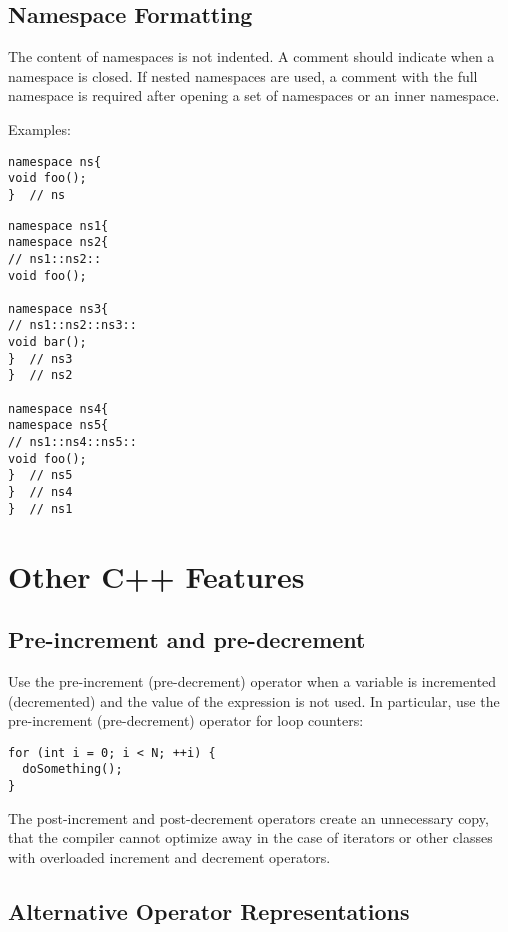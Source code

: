 \subsection{Namespace Formatting}

The content of namespaces is not indented.
A comment should indicate when a namespace is closed.
If nested namespaces are used, a comment with the full namespace is required after opening a set of namespaces or an inner namespace.

Examples:
\begin{lstlisting}
namespace ns{
void foo();
}  // ns
\end{lstlisting}

\begin{lstlisting}
namespace ns1{
namespace ns2{
// ns1::ns2::
void foo();

namespace ns3{
// ns1::ns2::ns3::
void bar();
}  // ns3
}  // ns2

namespace ns4{
namespace ns5{
// ns1::ns4::ns5::
void foo();
}  // ns5
}  // ns4
}  // ns1
\end{lstlisting}


\section{Other C++ Features}

\subsection{Pre-increment and pre-decrement}

Use the pre-increment (pre-decrement) operator when a variable is incremented (decremented) and the value of the expression is not used.
In particular, use the pre-increment (pre-decrement) operator for loop counters:

\begin{lstlisting}[showspaces=false]
for (int i = 0; i < N; ++i) {
  doSomething();
}
\end{lstlisting}

The post-increment and post-decrement operators create an unnecessary copy, that the compiler cannot optimize away in the case of iterators or other classes with overloaded increment and decrement operators.

\subsection{Alternative Operator Representations}

